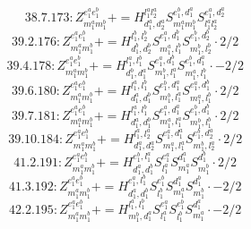 \documentclass[letterpaper,10pt,fleqn,leqno,onecolumn]{article}
\begin{document}
\begin{equation} \;\;\;\;\;\;  38.7.173: Z^{e_{1}^{a}e_{1}^{b}}_{m_{1}^{a}m_{1}^{b}}+=H^{l_{1}^{a}l_{2}^{a}}_{d_{1}^{a},d_{2}^{a}}S^{e_{1}^{b},d_{1}^{a}}_{m_{1}^{a}m_{1}^{b}}S^{e_{1}^{a},d_{2}^{a}}_{l_{1}^{a}l_{2}^{a}} \end{equation}
\begin{equation} \;\;\;\;\;\;  39.2.176: Z^{e_{1}^{a}e_{1}^{b}}_{m_{1}^{a}m_{1}^{b}}+=H^{l_{1}^{b},l_{2}^{b}}_{d_{1}^{b},d_{2}^{b}}S^{e_{1}^{a},d_{1}^{b}}_{m_{1}^{a},l_{1}^{b}}S^{e_{1}^{b},d_{2}^{b}}_{m_{1}^{b},l_{2}^{b}}\cdot 2/2 \end{equation}
\begin{equation} \;\;\;\;\;\;  39.4.178: Z^{e_{1}^{a}e_{1}^{b}}_{m_{1}^{a}m_{1}^{b}}+=H^{l_{1}^{a},l_{1}^{b}}_{d_{1}^{b},d_{1}^{a}}S^{e_{1}^{a},d_{1}^{b}}_{m_{1}^{b},l_{1}^{a}}S^{e_{1}^{b},d_{1}^{a}}_{m_{1}^{a},l_{1}^{b}}\cdot -2/2 \end{equation}
\begin{equation} \;\;\;\;\;\;  39.6.180: Z^{e_{1}^{a}e_{1}^{b}}_{m_{1}^{a}m_{1}^{b}}+=H^{l_{1}^{a},l_{1}^{b}}_{d_{1}^{a},d_{1}^{b}}S^{e_{1}^{b},d_{1}^{a}}_{m_{1}^{b},l_{1}^{a}}S^{e_{1}^{a},d_{1}^{b}}_{m_{1}^{a},l_{1}^{b}}\cdot 2/2 \end{equation}
\begin{equation} \;\;\;\;\;\;  39.7.181: Z^{e_{1}^{a}e_{1}^{b}}_{m_{1}^{a}m_{1}^{b}}+=H^{l_{1}^{a},l_{1}^{b}}_{d_{1}^{a},d_{1}^{b}}S^{e_{1}^{a},d_{1}^{a}}_{m_{1}^{a},l_{1}^{a}}S^{e_{1}^{b},d_{1}^{b}}_{m_{1}^{b},l_{1}^{b}}\cdot 2/2 \end{equation}
\begin{equation} \;\;\;\;\;\;  39.10.184: Z^{e_{1}^{a}e_{1}^{b}}_{m_{1}^{a}m_{1}^{b}}+=H^{l_{1}^{a},l_{2}^{a}}_{d_{1}^{a},d_{2}^{a}}S^{e_{1}^{a},d_{1}^{a}}_{m_{1}^{a},l_{1}^{a}}S^{e_{1}^{b},d_{2}^{a}}_{m_{1}^{b},l_{2}^{a}}\cdot 2/2 \end{equation}
\begin{equation} \;\;\;\;\;\;  41.2.191: Z^{e_{1}^{a}e_{1}^{b}}_{m_{1}^{a}m_{1}^{b}}+=H^{e_{1}^{b},l_{1}^{a}}_{d_{1}^{a},d_{1}^{b}}S^{e_{1}^{a}}_{l_{1}^{a}}S^{d_{1}^{a}}_{m_{1}^{a}}S^{d_{1}^{b}}_{m_{1}^{b}}\cdot 2/2 \end{equation}
\begin{equation} \;\;\;\;\;\;  41.3.192: Z^{e_{1}^{a}e_{1}^{b}}_{m_{1}^{a}m_{1}^{b}}+=H^{e_{1}^{a},l_{1}^{b}}_{d_{1}^{a},d_{1}^{b}}S^{e_{1}^{b}}_{l_{1}^{b}}S^{d_{1}^{a}}_{m_{1}^{a}}S^{d_{1}^{b}}_{m_{1}^{b}}\cdot -2/2 \end{equation}
\begin{equation} \;\;\;\;\;\;  42.2.195: Z^{e_{1}^{a}e_{1}^{b}}_{m_{1}^{a}m_{1}^{b}}+=H^{l_{1}^{a},l_{1}^{b}}_{m_{1}^{b},d_{1}^{a}}S^{e_{1}^{a}}_{l_{1}^{a}}S^{e_{1}^{b}}_{l_{1}^{b}}S^{d_{1}^{a}}_{m_{1}^{a}}\cdot -2/2 \end{equation}
\end{document}
